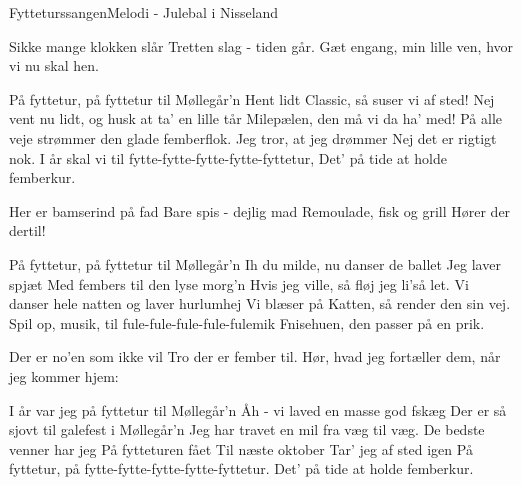 \begin{sang}{Fytteturssangen}{Melodi - Julebal i Nisseland}
\begin{vers}
Sikke mange klokken slår
Tretten slag - tiden går.
Gæt engang, min lille ven,
hvor vi nu skal hen.
\end{vers}
\begin{vers}
På fyttetur, på fyttetur til Møllegår'n
Hent lidt Classic, så suser vi af sted!
Nej vent nu lidt, og husk at ta' en lille tår
Milepælen, den må vi da ha' med!
På alle veje strømmer den glade femberflok.
Jeg tror, at jeg drømmer
Nej det er rigtigt nok.
I år skal vi til fytte-fytte-fytte-fytte-fyttetur,
Det' på tide at holde femberkur.
\end{vers}
\begin{vers}
Her er bamserind på fad
Bare spis - dejlig mad
Remoulade, fisk og grill
Hører der dertil!
\end{vers}
\begin{vers}
På fyttetur, på fyttetur til Møllegår'n
Ih du milde, nu danser de ballet
Jeg laver spjæt
Med fembers til den lyse morg'n
Hvis jeg ville, så fløj jeg li'så let.
Vi danser hele natten og laver hurlumhej
Vi blæser på Katten, så render den sin vej.
Spil op, musik,
til fule-fule-fule-fule-fulemik
Fnisehuen, den passer på en prik.
\end{vers}
\begin{vers}
Der er no'en som ikke vil
Tro der er fember til.
Hør, hvad jeg fortæller dem,
når jeg kommer hjem:
\end{vers}
\begin{vers}
I år var jeg på fyttetur til Møllegår'n
Åh - vi laved en masse god fskæg
Der er så sjovt til galefest i Møllegår'n
Jeg har travet en mil fra væg til væg.
De bedste venner har jeg
På fytteturen fået
Til næste oktober
Tar' jeg af sted igen
På fyttetur, på fytte-fytte-fytte-fytte-fyttetur.
Det' på tide at holde femberkur.
\end{vers}
\laps
\end{sang}